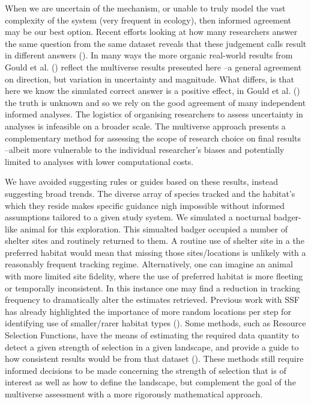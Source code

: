 \documentclass[10pt,a4paper]{article}
\begin{document}
When we are uncertain of the mechanism, or unable to truly model the vast complexity of the system (very frequent in ecology), then informed agreement may be our best option.
Recent efforts looking at how many researchers answer the same question from the same dataset reveals that these judgement calls result in different answers ().
In many ways the more organic real-world results from Gould et al. () reflect the multiverse results presented here --a general agreement on direction, but variation in uncertainty and magnitude.
What differs, is that here we know the simulated correct answer is a positive effect, in Gould et al. () the truth is unknown and so we rely on the good agreement of many independent informed analyses.
The logistics of organising researchers to assess uncertainty in analyses is infeasible on a broader scale.
The multiverse approach presents a complementary method for assessing the scope of research choice on final results --albeit more vulnerable to the individual researcher's biases and potentially limited to analyses with lower computational costs.

We have avoided suggesting rules or guides based on these results, instead suggesting broad trends.
The diverse array of species tracked and the habitat's which they reside makes specific guidance nigh impossible without informed assumptions tailored to a given study system.
We simulated a nocturnal badger-like animal for this exploration.
This simualted badger occupied a number of shelter sites and routinely returned to them.
A routine use of shelter site in a the preferred habitat would mean that missing those sites/locations is unlikely with a reasonably frequent tracking regime.
Alternatively, one can imagine an animal with more limited site fidelity, where the use of preferred habitat is more fleeting or temporally inconsistent.
In this instance one may find a reduction in tracking frequency to dramatically alter the estimates retrieved.
Previous work with SSF has already highlighted the importance of more random locations per step for identifying use of smaller/rarer habitat types ().
Some methods, such as Resource Selection Functions, have the means of estimating the required data quantity to detect a given strength of selection in a given landscape, and provide a guide to how consistent results would be from that dataset ().
These methods still require informed decisions to be made concerning the strength of selection that is of interest as well as how to define the landscape, but complement the goal of the multiverse assessment with a more rigorously mathematical approach.
\end{document}
